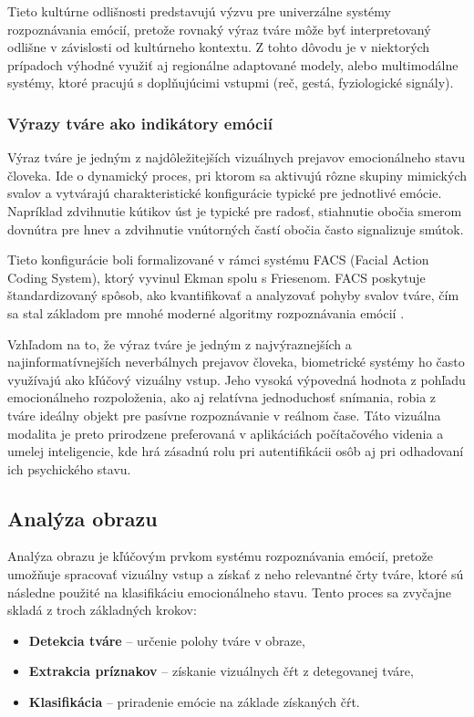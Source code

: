 Tieto kultúrne odlišnosti predstavujú výzvu pre univerzálne systémy rozpoznávania emócií, pretože rovnaký výraz tváre môže byť interpretovaný odlišne v závislosti od kultúrneho kontextu. Z tohto dôvodu je v niektorých prípadoch výhodné využiť aj regionálne 
adaptované modely, alebo multimodálne systémy, ktoré pracujú s doplňujúcimi vstupmi (reč, gestá, fyziologické signály).

\subsubsection{Výrazy tváre ako indikátory emócií}
Výraz tváre je jedným z najdôležitejších vizuálnych prejavov emocionálneho stavu človeka. Ide o dynamický proces, pri ktorom sa aktivujú rôzne skupiny mimických svalov a vytvárajú charakteristické konfigurácie typické pre jednotlivé emócie. Napríklad zdvihnutie kútikov úst je typické pre radosť, stiahnutie obočia smerom dovnútra pre hnev a zdvihnutie vnútorných častí obočia často signalizuje smútok.

Tieto konfigurácie boli formalizované v rámci systému FACS (Facial Action Coding System), ktorý vyvinul Ekman spolu s Friesenom. 
FACS poskytuje štandardizovaný spôsob, ako kvantifikovať a analyzovať pohyby svalov tváre, čím sa stal základom pre mnohé moderné algoritmy rozpoznávania emócií \cite{ekman1978facs}.

Vzhľadom na to, že výraz tváre je jedným z najvýraznejších a najinformatívnejších neverbálnych prejavov človeka, biometrické systémy ho často využívajú ako kľúčový vizuálny vstup. Jeho vysoká výpovedná hodnota z pohľadu emocionálneho rozpoloženia, ako aj relatívna jednoduchosť snímania, robia z tváre ideálny objekt pre pasívne rozpoznávanie v reálnom čase. 
Táto vizuálna modalita je preto prirodzene preferovaná v aplikáciách počítačového videnia a umelej inteligencie, kde hrá zásadnú rolu pri autentifikácii osôb aj pri odhadovaní ich psychického stavu.

\subsection{Analýza obrazu}
Analýza obrazu je kľúčovým prvkom systému rozpoznávania emócií, pretože umožňuje spracovať vizuálny vstup a získať z neho relevantné črty tváre, ktoré sú následne použité na klasifikáciu emocionálneho stavu. Tento proces sa zvyčajne skladá z troch základných krokov:

\begin{itemize}
    \item \textbf{Detekcia tváre} -- určenie polohy tváre v obraze,
    \item \textbf{Extrakcia príznakov} -- získanie vizuálnych čŕt z detegovanej tváre,
    \item \textbf{Klasifikácia} -- priradenie emócie na základe získaných čŕt.
\end{itemize}

